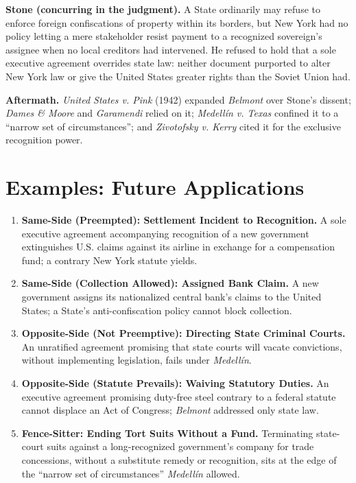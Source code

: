 \documentclass[12pt]{article}
\begin{document}
\textbf{Stone (concurring in the judgment).} A State ordinarily may refuse to enforce foreign confiscations of property within its borders, but New York had no policy letting a mere stakeholder resist payment to a recognized sovereign's assignee when no local creditors had intervened. He refused to hold that a sole executive agreement overrides state law: neither document purported to alter New York law or give the United States greater rights than the Soviet Union had.

\textbf{Aftermath.} \textit{United States v. Pink} (1942) expanded \textit{Belmont} over Stone's dissent; \textit{Dames \& Moore} and \textit{Garamendi} relied on it; \textit{Medell\'in v. Texas} confined it to a ``narrow set of circumstances''; and \textit{Zivotofsky v. Kerry} cited it for the exclusive recognition power.

\section{Examples: Future Applications}

\begin{enumerate}
\item \textbf{Same-Side (Preempted): Settlement Incident to Recognition.} A sole executive agreement accompanying recognition of a new government extinguishes U.S. claims against its airline in exchange for a compensation fund; a contrary New York statute yields.
\item \textbf{Same-Side (Collection Allowed): Assigned Bank Claim.} A new government assigns its nationalized central bank's claims to the United States; a State's anti-confiscation policy cannot block collection.
\item \textbf{Opposite-Side (Not Preemptive): Directing State Criminal Courts.} An unratified agreement promising that state courts will vacate convictions, without implementing legislation, fails under \textit{Medell\'in}.
\item \textbf{Opposite-Side (Statute Prevails): Waiving Statutory Duties.} An executive agreement promising duty-free steel contrary to a federal statute cannot displace an Act of Congress; \textit{Belmont} addressed only state law.
\item \textbf{Fence-Sitter: Ending Tort Suits Without a Fund.} Terminating state-court suits against a long-recognized government's company for trade concessions, without a substitute remedy or recognition, sits at the edge of the ``narrow set of circumstances'' \textit{Medell\'in} allowed.
\end{enumerate}
\end{document}
